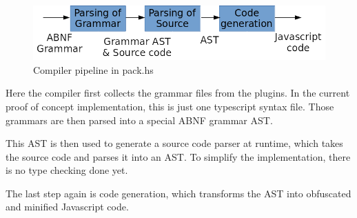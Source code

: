 \begin{figure}[H]
\includegraphics[width=\columnwidth]{./pack_hs_pipeline.png}
\caption{Compiler pipeline in pack.hs}%
\label{fig:pack.hs_pipeline}
\end{figure}

Here the compiler first collects the grammar files from the plugins. In the current proof of concept implementation, this is just one typescript syntax file. Those grammars are then parsed into a special ABNF grammar AST\@.

This AST is then used to generate a source code parser at runtime, which takes the source code and parses it into an AST\@. To simplify the implementation, there is no type checking done yet.

The last step again is code generation, which transforms the AST into obfuscated and minified Javascript code.
